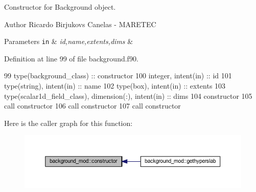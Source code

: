 Constructor for Background object. 

\begin{DoxyAuthor}{Author}
Ricardo Birjukovs Canelas -\/ M\+A\+R\+E\+T\+EC 
\end{DoxyAuthor}

\begin{DoxyParams}[1]{Parameters}
\mbox{\tt in}  & {\em id,name,extents,dims} & \\
\hline
\end{DoxyParams}


Definition at line 99 of file background.\+f90.


\begin{DoxyCode}
99     \textcolor{keywordtype}{type}(background\_class) :: constructor
100     \textcolor{keywordtype}{integer}, \textcolor{keywordtype}{intent(in)} :: id
101     \textcolor{keywordtype}{type}(string), \textcolor{keywordtype}{intent(in)} :: name
102     \textcolor{keywordtype}{type}(box), \textcolor{keywordtype}{intent(in)} :: extents
103     \textcolor{keywordtype}{type}(scalar1d\_field\_class), \textcolor{keywordtype}{dimension(:)}, \textcolor{keywordtype}{intent(in)} :: dims
104     constructor%
105     \textcolor{keyword}{call }constructor%
106     \textcolor{keyword}{call }constructor%
107     \textcolor{keyword}{call }constructor%
\end{DoxyCode}
Here is the caller graph for this function\+:\nopagebreak
\begin{figure}[H]
\begin{center}
\leavevmode
\includegraphics[width=350pt]{namespacebackground__mod_ad0096fb6a5a11854fd70a7ce58dc3000_icgraph}
\end{center}
\end{figure}
\mbox{\label{namespacebackground__mod_a64c3966a113bc0f3b603c591bc345ca1}} 
